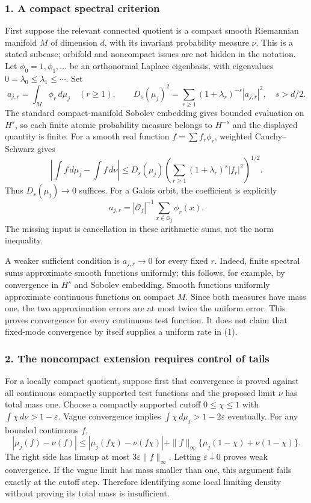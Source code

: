 \documentclass[11pt]{article}
\begin{document}
\subsubsection{1. A compact spectral criterion}
First suppose the relevant connected quotient is a compact smooth Riemannian manifold $M$ of dimension $d$, with its invariant probability measure $\nu$. This is a stated subcase; orbifold and noncompact issues are not hidden in the notation. Let $\phi_0=1,\phi_1,\ldots$ be an orthonormal Laplace eigenbasis, with eigenvalues $0=\lambda_0\le\lambda_1\le\cdots$. Set
\[a_{j,r}=\int_M\phi_r\,d\mu_j\quad(r\ge1),\qquad
D_s(\mu_j)^2=\sum_{r\ge1}(1+\lambda_r)^{-s}|a_{j,r}|^2,\quad s>d/2.\]
The standard compact-manifold Sobolev embedding gives bounded evaluation on $H^s$, so each finite atomic probability measure belongs to $H^{-s}$ and the displayed quantity is finite. For a smooth real function $f=\sum f_r\phi_r$, weighted Cauchy--Schwarz gives
\[\left|\int f\,d\mu_j-\int f\,d\nu\right|
\le D_s(\mu_j)\left(\sum_{r\ge1}(1+\lambda_r)^s|f_r|^2\right)^{1/2}.\tag{1}\]
Thus $D_s(\mu_j)\to0$ suffices. For a Galois orbit, the coefficient is explicitly
\[a_{j,r}=|\mathcal O_j|^{-1}\sum_{x\in\mathcal O_j}\phi_r(x).\]
The missing input is cancellation in these arithmetic sums, not the norm inequality.

A weaker sufficient condition is $a_{j,r}\to0$ for every fixed $r$. Indeed, finite spectral sums approximate smooth functions uniformly; this follows, for example, by convergence in $H^s$ and Sobolev embedding. Smooth functions uniformly approximate continuous functions on compact $M$. Since both measures have mass one, the two approximation errors are at most twice the uniform error. This proves convergence for every continuous test function. It does not claim that fixed-mode convergence by itself supplies a uniform rate in (1).

\subsubsection{2. The noncompact extension requires control of tails}
For a locally compact quotient, suppose first that convergence is proved against all continuous compactly supported test functions and the proposed limit $\nu$ has total mass one. Choose a compactly supported cutoff $0\le\chi\le1$ with $\int\chi\,d\nu>1-\varepsilon$. Vague convergence implies $\int\chi\,d\mu_j>1-2\varepsilon$ eventually. For any bounded continuous $f$,
\[|\mu_j(f)-\nu(f)|\le |\mu_j(f\chi)-\nu(f\chi)|+
\|f\|_\infty\{\mu_j(1-\chi)+\nu(1-\chi)\}.\]
The right side has limsup at most $3\varepsilon\|f\|_\infty$. Letting $\varepsilon\downarrow0$ proves weak convergence. If the vague limit has mass smaller than one, this argument fails exactly at the cutoff step. Therefore identifying some local limiting density without proving its total mass is insufficient.
\end{document}
